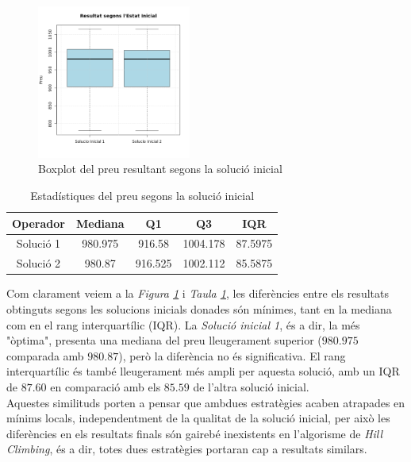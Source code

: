 \documentclass[a4paper]{article}
\begin{document}
	\begin{figure}[H]
		\centering
		\includegraphics[width=0.45\textwidth]{images/exp2_boxplot.png}
		\caption{Boxplot del preu resultant segons la solució inicial}
		\label{fig:exp2_boxplot}
	\end{figure}
	
	\begin{table}[H]
		\centering
		\begin{tabular}{|c|c|c|c|c|}
			\hline
			\textbf{Operador} & \textbf{Mediana} & \textbf{Q1} & \textbf{Q3} & \textbf{IQR} \\
			\hline
			Solució 1 & 980.975 & 916.58 & 1004.178 & 87.5975 \\
			\hline
			Solució 2 & 980.87 & 916.525 & 1002.112 & 85.5875 \\
			\hline
		\end{tabular}
		\caption{Estadístiques del preu segons la solució inicial}
		\label{tab:exp2_estadisticas}
	\end{table}
	
	Com clarament veiem a la \textit{Figura \ref{fig:exp2_boxplot}} i \textit{Taula \ref{tab:exp2_estadisticas}}, les diferències entre els resultats obtinguts segons les solucions inicials donades són mínimes, tant en la mediana com en el rang interquartílic (IQR). La \textit{Solució inicial 1}, és a dir, la més "òptima", presenta una mediana del preu lleugerament superior ($980.975$ comparada amb $980.87$), però la diferència no és significativa. El rang interquartílic és també lleugerament més ampli per aquesta solució, amb un IQR de $87.60$ en comparació amb els $85.59$ de l'altra solució inicial.\\
	
	Aquestes similituds porten a pensar que ambdues estratègies acaben atrapades en mínims locals, independentment de la qualitat de la solució inicial, per això les diferències en els resultats finals són gairebé inexistents en l'algorisme de \textit{Hill Climbing}, és a dir, totes dues estratègies portaran cap a resultats similars.\\
	
\end{document}
